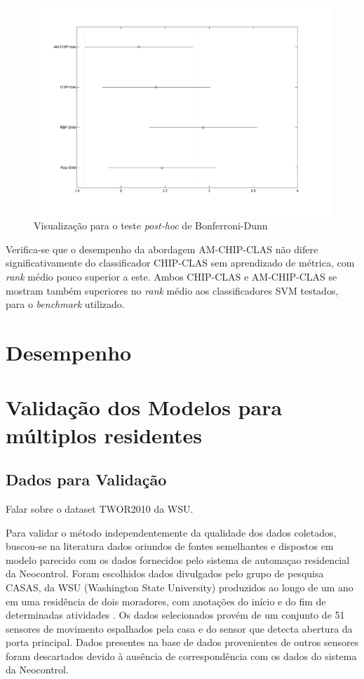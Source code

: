 \documentclass[
	12pt,				%
	openright,			%
	twoside,			%
	a4paper,			%
	english,			%
	spanish,			%
	brazil,				%
	]{abntex2}\usepackage[]{graphicx}\usepackage[]{color}
\begin{document}
\begin{figure}[ht]
\includegraphics[width=\textwidth]{graf_friedman}
\caption{Visualização para o teste \textit{post-hoc} de Bonferroni-Dunn}
\label{bonfe}
\end{figure}

\par Verifica-se que o desempenho da abordagem AM-CHIP-CLAS não difere significativamente do classificador CHIP-CLAS sem aprendizado de métrica, com \textit{rank} médio pouco superior a este. Ambos CHIP-CLAS e AM-CHIP-CLAS se mostram também superiores no \textit{rank} médio aos classificadores SVM testados, para o \textit{benchmark} utilizado.

\section{Desempenho}


\section{Validação dos Modelos para múltiplos residentes}

\subsection{Dados para Validação}

Falar sobre o dataset TWOR2010 da WSU.

Para validar o método independentemente da qualidade dos dados coletados, buscou-se na literatura dados oriundos de fontes semelhantes e dispostos em modelo parecido com os dados fornecidos pelo sistema de automaçao residencial da Neocontrol. Foram escolhidos dados divulgados pelo grupo de pesquisa CASAS, da WSU (Washington State University) produzidos ao longo de um ano em uma residência de dois moradores, com anotações do início e do fim de determinadas atividades \cite{Cook2009}. Os dados selecionados provém de um conjunto de 51 sensores de movimento espalhados pela casa e do sensor que detecta abertura da porta principal. Dados presentes na base de dados provenientes de outros sensores foram descartados devido à ausência de correspondência com os dados do sistema da Neocontrol.
\end{document}
